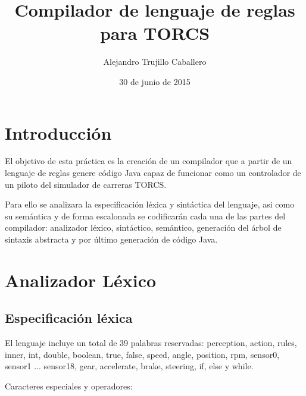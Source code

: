 \documentclass[11pt]{article}
\title{\textbf{\huge{Compilador de lenguaje de reglas para TORCS}}}
\author{Alejandro Trujillo Caballero}
\date{30 de junio de 2015}
\begin{document}
\maketitle
\thispagestyle{empty}
\newpage

\tableofcontents
\newpage

\section{Introducción}

El objetivo de esta práctica es la creación de un compilador que a partir de un lenguaje de reglas genere código Java
capaz de funcionar como un controlador de un piloto del simulador de carreras TORCS.


Para ello se analizara la especificación léxica y sintáctica del lenguaje, asi como su semántica y de forma escalonada se
codificarán cada una de las partes del compilador: analizador léxico, sintáctico, semántico, generación del árbol de sintaxis abstracta
y por último generación de código Java.

\section{Analizador Léxico}
\subsection{Especificación léxica}
El lenguaje incluye un total de 39 palabras reservadas:
perception, action, rules, inner, int, double, boolean, true, false, speed, angle, position, rpm, sensor0, sensor1 ... sensor18, gear, accelerate, brake, steering, if, else y while.

Caracteres especiales y operadores:
\end{document}
